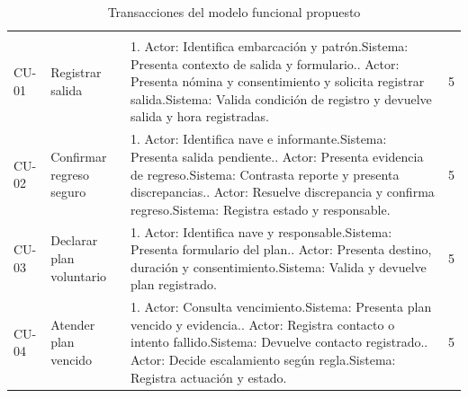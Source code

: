 \begingroup\small\begin{longtable}{L{14mm}L{27mm}L{97mm}R{9mm}}
\caption{Transacciones del modelo funcional propuesto}\label{tab:t15-ucp-transacciones}\\\hline
  &  &  & \\\hline\endfirsthead
\hline {} &  &  & \\\hline\endhead
CU-01 & Registrar salida & 1. Actor: Identifica embarcación y patrón.\newline Sistema: Presenta contexto de salida y formulario.. Actor: Presenta nómina y consentimiento y solicita registrar salida.\newline Sistema: Valida condición de registro y devuelve salida y hora registradas. & 5\\\hline
CU-02 & Confirmar regreso seguro & 1. Actor: Identifica nave e informante.\newline Sistema: Presenta salida pendiente.. Actor: Presenta evidencia de regreso.\newline Sistema: Contrasta reporte y presenta discrepancias.. Actor: Resuelve discrepancia y confirma regreso.\newline Sistema: Registra estado y responsable. & 5\\\hline
CU-03 & Declarar plan voluntario & 1. Actor: Identifica nave y responsable.\newline Sistema: Presenta formulario del plan.. Actor: Presenta destino, duración y consentimiento.\newline Sistema: Valida y devuelve plan registrado. & 5\\\hline
CU-04 & Atender plan vencido & 1. Actor: Consulta vencimiento.\newline Sistema: Presenta plan vencido y evidencia.. Actor: Registra contacto o intento fallido.\newline Sistema: Devuelve contacto registrado.. Actor: Decide escalamiento según regla.\newline Sistema: Registra actuación y estado. & 5\\\hline

\end{longtable}
